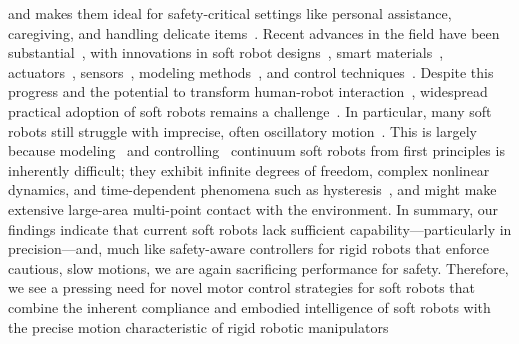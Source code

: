 and makes them ideal for safety-critical settings like personal assistance, caregiving, and handling delicate items~\citep{abidi2017intrinsic, yumbla2021human}.
Recent advances in the field have been substantial~\citep{yasa2023overview}, with innovations in soft robot designs~\citep{laschi2012soft, hawkes2017soft, guan2023trimmed, katzschmann2018exploration, tolley2014resilient}, smart materials~\citep{terryn2017self, mazzolai2022roadmap}, actuators~\citep{shepherd2013using, vasios2020harnessing, lipton2018handedness, gravert2024low, wehner2016integrated, aubin2022towards}, sensors~\citep{larson2016highly, thuruthel2019soft, truby2020distributed}, modeling methods~\citep{renda2018discrete, boyer2020dynamics, renda2020geometric}, and control techniques~\citep{thuruthel2018model, della2020model, jitosho2023reinforcement, pustina2024input}. Despite this progress and the potential to transform human-robot interaction~\citep{jorgensen2022soft}, widespread practical adoption of soft robots remains a challenge~\citep{hawkes2021hard}. In particular, many soft robots still struggle with imprecise, often oscillatory motion~\citep{mazzolai2022roadmap, majidi2014soft, hawkes2017soft}. This is largely because modeling~\citep{armanini2023soft} and controlling~\citep{della2023model} continuum soft robots from first principles is inherently difficult; they exhibit infinite degrees of freedom, complex nonlinear dynamics, and time-dependent phenomena such as hysteresis~\citep{armanini2023soft}, and might make extensive large-area multi-point contact with the environment.
In summary, our findings indicate that current soft robots lack sufficient capability—particularly in precision—and, much like safety-aware controllers for rigid robots that enforce cautious, slow motions, we are again sacrificing performance for safety.
Therefore, we see a pressing need for novel motor control strategies for soft robots that combine the inherent compliance and embodied intelligence of soft robots with the precise motion characteristic of rigid robotic manipulators

